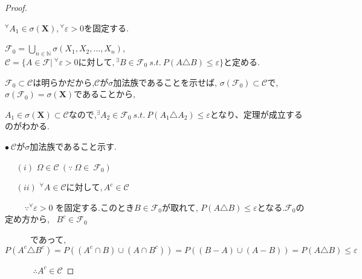\documentclass{jsarticle}
\begin{document}
\begin{proof}
$\quad$\par
${}^\forall A_{1} \in \sigma (\textbf{X}), {}^\forall \varepsilon > 0$を固定する. \par
$\mathscr{F}_{0} = \displaystyle\bigcup_{n \in  \mathbb{N}} \sigma (X_{1}, X_{2}, \dots, X_{n}) $, $\mathcal{C} = {\lbrace A \in \mathcal{F} | \ {}^\forall \varepsilon > 0 に対して, {}^\exists B \in \mathscr{F}_{0} \ s.t. \ P(A \triangle B) \le \varepsilon \rbrace  }$と定める. \par
$\mathscr{F}_{0}  \subset \mathcal{C}$は明らかだから,$\mathcal{C}$が$\sigma$加法族であることを示せば, $\sigma (\mathscr{F}_{0}) \subset \mathcal{C}$で, $\sigma (\mathscr{F}_{0}) = \sigma (\textbf {X})$であることから,\par
$A_{1} \in \sigma (\textbf{X}) \subset \mathcal{C}$なので,${}^\exists A_{2} \in \mathscr{F}_{0} \ s.t. \ P(A_{1} \triangle A_{2}) \le \varepsilon$となり、定理が成立するのがわかる.\par
$\bullet \ \mathcal{C}$が$\sigma$加法族であること示す.\par
$\quad$ $(i)$ $\Omega \in \mathcal{C} \ (\because \ \Omega \in \ \mathscr{F}_{0}) $\par

$\quad$ $(ii)$ ${}^\forall A \in \mathcal{C}に対して, A^c \in \mathcal{C}$\par
$\qquad$ $\because {}^\forall \varepsilon > 0$ を固定する.このとき$B \in \mathcal{F}_{0}$が取れて, $P(A \triangle B) \le \varepsilon $となる.$\mathcal{F}_{0}$の定め方から, \ $B^c \in \mathcal{F}_{0}$ \par $\quad \qquad$であって, $P(A^c \triangle B^c) = P((A^c \cap B) \cup (A \cap B^c)) = P((B-A) \cup (A-B)) = P(A \triangle B) \le \varepsilon$\par $\quad \qquad$ $\therefore A^c \in \mathcal{C}$


\end{proof}
\end{document}
